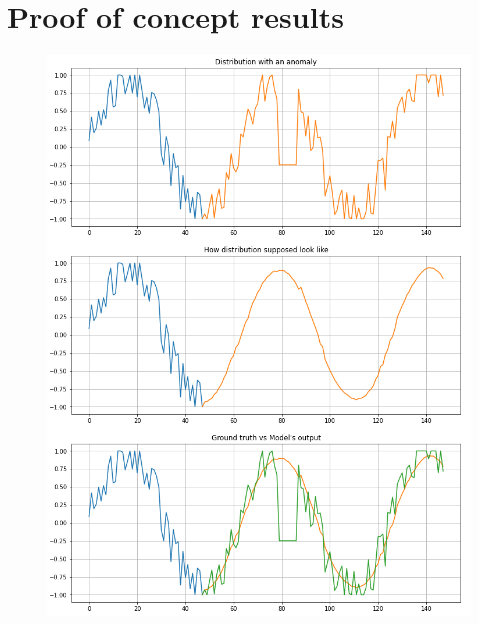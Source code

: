 \chapter{Proof of concept results}\label{appendix:poc-results}

\begin{figure}[H]
    \includegraphics[width=14cm]{assets/appendix/poc-results.png}
\end{figure}